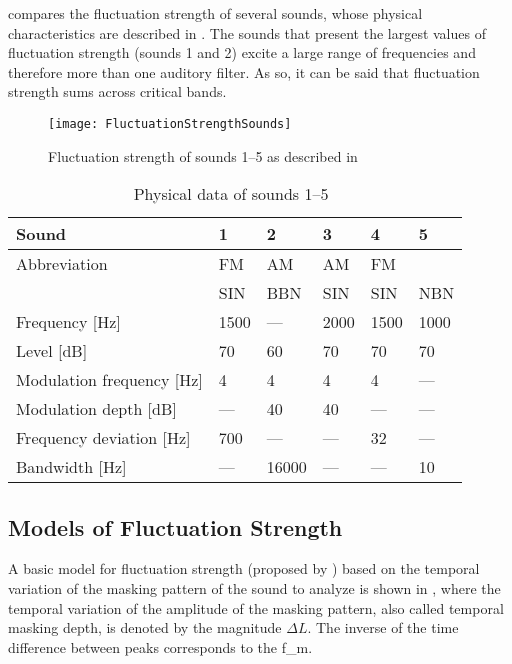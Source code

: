 \documentclass[../main.tex]{subfiles}
\begin{document}
\begin{theoreticalbackground}
 compares the fluctuation strength of several sounds,
whose physical characteristics are described in . The
sounds that present the largest values of fluctuation strength (sounds 1 and 2)
excite a large range of frequencies and therefore more than one auditory filter.
As so, it can be said that fluctuation strength sums across critical bands.

\begin{figure}[!ht]
  \centering
  \texttt{[image: FluctuationStrengthSounds]}
  \caption{Fluctuation strength of sounds 1--5 as described in
    ~\cite[pp. 252]{Fastl2007Psychoacoustics}}
\label{fig:flucstrensnds}
\end{figure}

\begin{table}[!ht]
  \centering
  \begin{tabu} to \linewidth{ lXXXXX }
    \toprule
    Sound & 1 & 2 & 3 & 4 & 5 \\
    \midrule
    Abbreviation & FM & AM & AM & FM & \\
    & SIN & BBN & SIN & SIN & NBN \\
    Frequency [Hz] & 1500 & --- & 2000 & 1500 & 1000 \\
    Level [dB] & 70 & 60 & 70 & 70 & 70 \\
    Modulation frequency [Hz] & 4 & 4 & 4 & 4 & --- \\
    Modulation depth [dB] & --- & 40 & 40 & --- & --- \\
    Frequency deviation [Hz] & 700 & --- & --- & 32 & --- \\
    Bandwidth [Hz] & --- & 16000 & --- & --- & 10 \\
    \bottomrule
  \end{tabu}
  \caption{Physical data of sounds
    1--5~\cite[pp. 253]{Fastl2007Psychoacoustics}}
\label{tab:flucstrensnds}
\end{table}

\subsection{Models of Fluctuation Strength}

A basic model for fluctuation strength (proposed by
\textcite[pp.~254]{Fastl2007Psychoacoustics}) based on the temporal variation of
the masking pattern of the sound to analyze is shown in
, where the temporal variation of the amplitude of the
masking pattern, also called temporal masking depth, is denoted by the magnitude
$\Delta L$. The inverse of the time difference between peaks corresponds to the
\gls{f_m}.


\end{theoreticalbackground}
\end{document}
